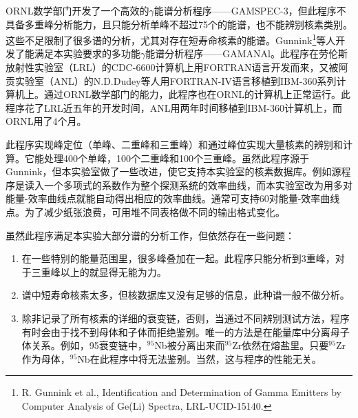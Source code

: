 ORNL数学部门开发了一个高效的$\gamma$能谱分析程序——GAMSPEC-3，但此程序不具备多重峰分析能力，且只能分析单峰不超过75个的能谱，也不能辨别核素类别。这些不足限制了很多谱的分析，尤其对存在短寿命核素的能谱。Gunnink\footnote{R. Gunnink et al., Identification and Determination of Gamma Emitters by Computer Analysis of Ge(Li) Spectra, LRL-UCID-15140.}等人开发了能满足本实验要求的多功能$\gamma$能谱分析程序——GAMANAl。此程序在劳伦斯放射性实验室（LRL）的CDC-6600计算机上用FORTRAN语言开发而来，又被阿贡实验室（ANL）的N.D.Dudey等人用FORTRAN-IV语言移植到IBM-360系列计算机上。通过ORNL数学部门的能力，此程序也在ORNL的计算机上正常运行。此程序花了LRL近五年的开发时间，ANL用两年时间移植到IBM-360计算机上，而ORNL用了4个月。

此程序实现峰定位（单峰、二重峰和三重峰）和通过峰位实现大量核素的辨别和计算。它能处理400个单峰，100个二重峰和100个三重峰。虽然此程序源于Gunnink，但本实验室做了一些改进，使它支持本实验室的核素数据库。例如源程序是读入一个多项式的系数作为整个探测系统的效率曲线，而本实验室改为用多对能量-效率曲线点就能自动得出相应的效率曲线。通常可支持60对能量-效率曲线点。为了减少纸张浪费，可用堆不同表格做不同的输出格式变化。

虽然此程序满足本实验大部分谱的分析工作，但依然存在一些问题：
\begin{enumerate}
\item{在一些特别的能量范围里，很多峰叠加在一起。此程序只能分析到3重峰，对于三重峰以上的就显得无能为力。}
\item{谱中短寿命核素太多，但核数据库又没有足够的信息，此种谱一般不做分析。}
\item{除非记录了所有核素的详细的衰变链，否则，当通过不同辨别测试方法，程序有时会由于找不到母体和子体而拒绝鉴别。唯一的方法是在能量库中分离母子体关系。例如，95衰变链中，$^{95}$Nb被分离出来而$^{95}$Zr依然在熔盐里。只要$^{95}$Zr作为母体，$^{95}$Nb在此程序中将无法鉴别。当然，这与程序的性能无关。}
\end{enumerate}
